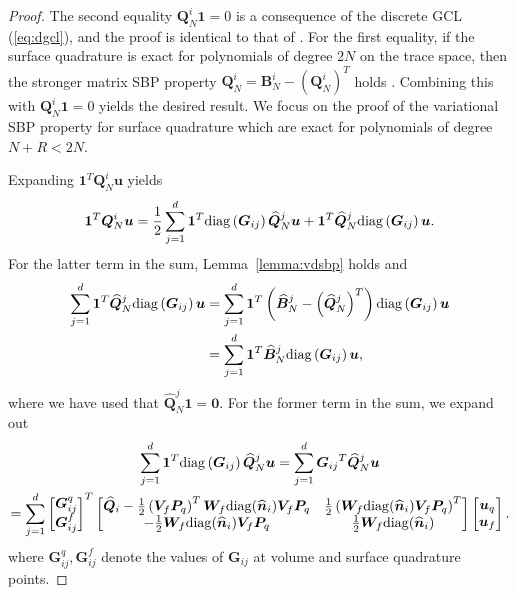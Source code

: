\documentclass[review]{siamart0216}
\theoremstyle{assumption}
\renewcommand{\hat}[1]{\widehat{#1}}
\newcommand{\LRp}[1]{\left( #1 \right)}
\newcommand{\diag}[1]{{\rm diag}\LRp{#1}}
\begin{document}
\begin{proof}
The second equality $\bm{Q}^i_N \bm{1} = 0$ is a consequence of the discrete GCL (\ref{eq:dgcl}), and the proof is identical to that of \cite{chan2018discretely}.  For the first equality, if the surface quadrature is exact for polynomials of degree $2N$ on the trace space, then the stronger matrix SBP property $\bm{Q}^i_N = \bm{B}^i_N - \LRp{\bm{Q}^i_N}^T$ holds \cite{chan2018discretely}.  Combining this with $\bm{Q}^i_N\bm{1} = 0$ yields the desired result.  We focus on the proof of the variational SBP property for surface quadrature which are exact for polynomials of degree $N+R < 2N$.  

Expanding $\bm{1}^T\bm{Q}^i_N\bm{u}$ yields
\[
\bm{1}^T\bm{Q}^i_N\bm{u} = \frac{1}{2}\sum_{j=1}^d \bm{1}^T \diag{\bm{G}_{ij}} \hat{\bm{Q}}^j_N \bm{u} + \bm{1}^T\hat{\bm{Q}}^j_N \diag{\bm{G}_{ij}} \bm{u}. %
\]
For the latter term in the sum, Lemma~\ref{lemma:vdsbp} holds and
\begin{align}
\sum_{j=1}^d\bm{1}^T\hat{\bm{Q}}^j_N \diag{\bm{G}_{ij}} \bm{u} &= 
\sum_{j=1}^d\bm{1}^T\LRp{\hat{\bm{B}}^j_N - \LRp{\hat{\bm{Q}}^j_N}^T} \diag{\bm{G}_{ij}} \bm{u} \\
&= \sum_{j=1}^d\bm{1}^T\hat{\bm{B}}^j_N\diag{\bm{G}_{ij}}\bm{u}, \nonumber
\label{eq:vsbp1}
\end{align}
where we have used that $\hat{\bm{Q}}^j_N \bm{1} = \bm{0}$.  For the former term in the sum, we expand out 
\begin{gather}
\sum_{j=1}^d\bm{1}^T \diag{\bm{G}_{ij}} \hat{\bm{Q}}^j_N \bm{u} = 
\sum_{j=1}^d{\bm{G}_{ij}}^T \hat{\bm{Q}}^j_N \bm{u} \\
= \sum_{j=1}^d\begin{bmatrix}
\bm{G}^q_{ij}\\
\bm{G}^f_{ij}
\end{bmatrix}^T \begin{bmatrix} 
\hat{\bm{Q}}_i - \frac{1}{2}\LRp{\bm{V}_f \bm{P}_q}^T  \bm{W}_f{\rm diag}(\hat{\bm{n}}_i) \bm{V}_f\bm{P}_q &  \frac{1}{2}\LRp{\bm{W}_f{\rm diag}(\hat{\bm{n}}_i)\bm{V}_f\bm{P}_q}^T\label{eq:ibpg}\\
-\frac{1}{2}\bm{W}_f{\rm diag}(\hat{\bm{n}}_i)\bm{V}_f\bm{P}_q & \frac{1}{2}\bm{W}_f{\rm diag}(\hat{\bm{n}}_i)
\end{bmatrix} \begin{bmatrix}\bm{u}_q\\
\bm{u}_f\end{bmatrix}.\nonumber
\end{gather}
where $\bm{G}^q_{ij},\bm{G}^f_{ij}$ denote the values of $\bm{G}_{ij}$ at volume and surface quadrature points.  


\end{proof}
\end{document}
